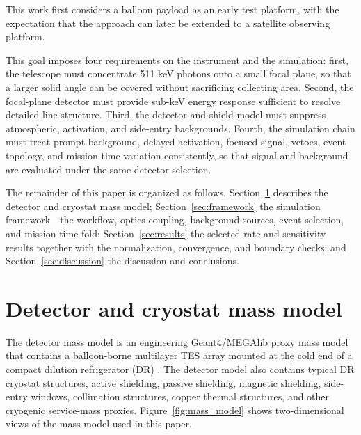 \documentclass[11pt]{article}
\begin{document}
This work first considers a balloon payload as an early test platform, with the expectation that the approach can later be extended to a satellite observing platform.

This goal imposes four requirements on the instrument and the simulation: first, the telescope must concentrate 511 keV photons onto a small focal plane, so that a larger solid angle can be covered without sacrificing collecting area. Second, the focal-plane detector must provide sub-keV energy response sufficient to resolve detailed line structure. Third, the detector and shield model must suppress atmospheric, activation, and side-entry backgrounds. Fourth, the simulation chain must treat prompt background, delayed activation, focused signal, vetoes, event topology, and mission-time variation consistently, so that signal and background are evaluated under the same detector selection.

The remainder of this paper is organized as follows. Section~\ref{sec:geometry} describes the detector and cryostat mass model; Section~\ref{sec:framework} the simulation framework---the workflow, optics coupling, background sources, event selection, and mission-time fold; Section~\ref{sec:results} the selected-rate and sensitivity results together with the normalization, convergence, and boundary checks; and Section~\ref{sec:discussion} the discussion and conclusions.

\section{Detector and cryostat mass model}
\label{sec:geometry}

The detector mass model is an engineering Geant4/MEGAlib proxy mass model that contains a balloon-borne multilayer TES array mounted at the cold end of a compact dilution refrigerator (DR) \cite{Shirazi2023,Gottardi2021TESReview}. The detector model also contains typical DR cryostat structures, active shielding, passive shielding, magnetic shielding, side-entry windows, collimation structures, copper thermal structures, and other cryogenic service-mass proxies. Figure~\ref{fig:mass_model} shows two-dimensional views of the mass model used in this paper.
\end{document}
